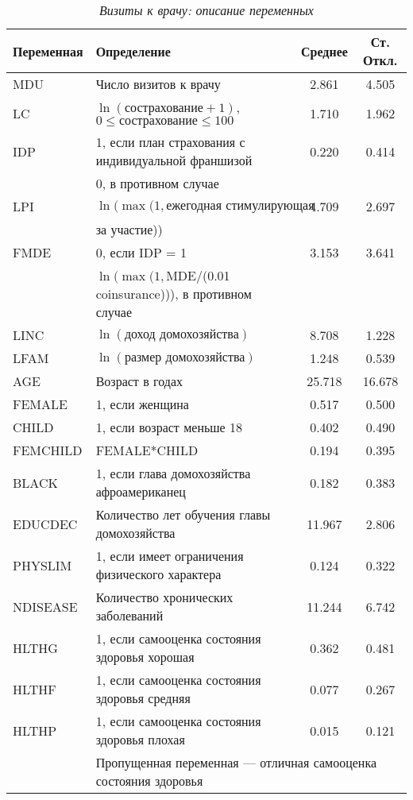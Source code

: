    \begin{table}[!htbp]\caption{\textit{Визиты к врачу: описание переменных}}\label{tab:20.4} %
    \begin{center}
\begin{tabular}{llcc}
\hline \hline
\textbf{Переменная}&\textbf{Определение}&\textbf{Среднее}&\textbf{Ст. Откл.}\\
\hline
MDU     & Число визитов к врачу &2.861&4.505\\
LC      & $\ln(\textrm{сострахование} + 1)$, $0 \le \textrm{сострахование} \le 100$ &1.710&1.962\\
IDP     & 1, если план страхования с индивидуальной франшизой&0.220&0.414\\
        & 0, в противном случае&&\\
LPI     & $\ln(\max(1, \textrm{ежегодная стимулирующая выплата}$  &4.709&2.697\\
        & \textrm{за участие}))&&\\
FMDE    & 0, если IDP = 1  &3.153&3.641\\
        & $\ln(\max(1, \textrm{MDE}$/(0.01 \textrm{coinsurance}))), в противном случае&&\\
LINC    & $\ln(\textrm{доход домохозяйства})$ &8.708&1.228\\
LFAM    & $\ln(\textrm{размер домохозяйства})$  &1.248&0.539\\
AGE     & Возраст в годах  &25.718&16.678\\
FEMALE  & 1, если женщина  &0.517&0.500\\
CHILD   & 1, если возраст меньше 18  &0.402&0.490\\
FEMCHILD& FEMALE*CHILD  &0.194&0.395\\
BLACK   & 1, если глава домохозяйства афроамериканец &0.182&0.383\\
EDUCDEC & Количество лет обучения главы домохозяйства  &11.967&2.806\\
PHYSLIM & 1, если имеет ограничения физического характера  &0.124&0.322\\
NDISEASE& Количество хронических заболеваний  &11.244&6.742\\
HLTHG   & 1, если самооценка состояния здоровья хорошая  &0.362&0.481\\
HLTHF   & 1, если самооценка состояния здоровья средняя  &0.077&0.267\\
HLTHP   & 1, если самооценка состояния здоровья плохая  &0.015&0.121\\
        & \multicolumn{3}{l}{Пропущенная переменная --- отличная самооценка состояния здоровья}\\
\hline\hline
\end{tabular}
    \end{center}
    \end{table}

